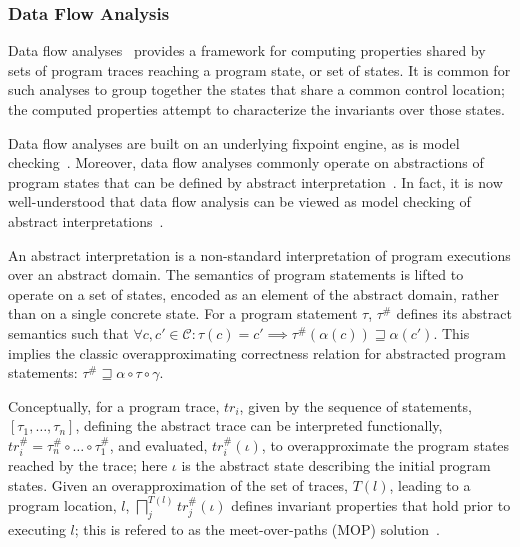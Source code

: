 \subsubsection{Data Flow Analysis}
Data flow analyses~\cite{kildall1973unified} 
provides a framework for computing properties shared by sets of
program traces reaching a program state, or set of states.  It is
common for such analyses to group together the states that share a
common control location; the computed properties attempt to characterize
the invariants over those states.

Data flow analyses are built on an underlying fixpoint engine, as is
model checking~\cite{Clarke:ModelCheckingBook}.  Moreover, data flow
analyses commonly operate on abstractions of program states that
can be defined by abstract interpretation~\cite{cousot1977abstract}. 
In fact, it is now well-understood that data flow analysis can be
viewed as model checking of abstract interpretations~\cite{Schmidt:POPL}.

An abstract interpretation is a 
non-standard interpretation of program executions over an abstract domain.  
The semantics of program statements is lifted to operate
on a set of states, encoded as an element of the abstract domain,
rather than on a single concrete state.  
For a program statement $\tau$,
$\tau^\#$ defines its abstract semantics such that
$\forall c, c' \in \mathcal{C} : \tau(c) = c' \implies \tau^\#(\alpha(c)) \sqsupseteq \alpha(c')$.  This implies the classic overapproximating correctness
relation for abstracted program statements:
$\tau^\# \sqsupseteq \alpha \circ \tau \circ \gamma$.

Conceptually, for a program trace, $tr_i$, given by the sequence of 
statements, $[\tau_1,\ldots,\tau_n]$, defining the abstract trace can
be interpreted functionally, $tr_i^\# = \tau_{n}^\# \circ \ldots \circ \tau_1^\#$,
and evaluated, $tr_i^\#(\iota)$,
to overapproximate the program states reached by the trace; 
here $\iota$ is the abstract state describing the initial program states.
Given an overapproximation of the set of traces, $T(l)$, leading to a 
program location, $l$, 
$\displaystyle\bigsqcap_j^{T(l)} tr_j^\#(\iota)$ 
defines invariant properties that hold prior to executing $l$; this
is refered to as the meet-over-paths (MOP) solution~\cite{kildall1973unified}.

